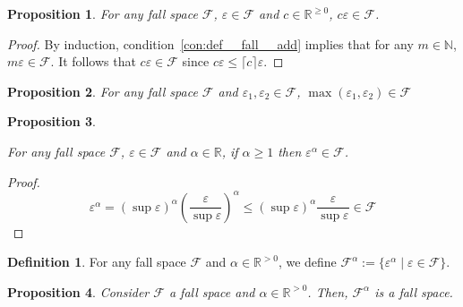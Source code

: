 \documentclass{article}
\numberwithin{equation}{section}
\theoremstyle{definition}
\newtheorem{definition}{Definition}[section]
\theoremstyle{plain}
\newtheorem{proposition}{Proposition}[section]
\newcommand{\Nats}{\mathbb{N}}
\newcommand{\Reals}{\mathbb{R}}
\newcommand{\Ceil}[1]{\lceil #1 \rceil}
\newcommand{\Fall}{\mathcal{F}}
\begin{document}
\begin{proposition}

For any fall space $\Fall$, $\varepsilon \in \Fall$ and $c \in \Reals^{\geq 0}$, $c \varepsilon \in \Fall$.

\end{proposition}

\begin{proof}

By induction, condition~\ref{con:def__fall__add} implies that for any $m \in \Nats$, $m\varepsilon \in \Fall$. It follows that $c\varepsilon \in \Fall$ since $c\varepsilon \leq \Ceil{c}\varepsilon$.
\end{proof}

\begin{proposition}

For any fall space $\Fall$ and $\varepsilon_1, \varepsilon_2 \in \Fall$, $\max(\varepsilon_1,\varepsilon_2) \in \Fall$

\end{proposition}


\begin{proposition}
\label{prp:fall_space_closed_wrt_power}

For any fall space $\Fall$, $\varepsilon \in \Fall$ and $\alpha \in \Reals$, if $\alpha \geq 1$ then $\varepsilon^\alpha \in \Fall$.

\end{proposition}

\begin{proof}

$$\varepsilon^\alpha = (\sup \varepsilon)^\alpha (\frac{\varepsilon}{\sup \varepsilon})^\alpha \leq  (\sup \varepsilon)^\alpha \frac{\varepsilon}{\sup \varepsilon} \in \Fall$$
\end{proof}

\begin{samepage}
\begin{definition}

For any fall space $\Fall$ and $\alpha \in \Reals^{>0}$, we define ${\Fall^\alpha := \{\varepsilon^\alpha \mid \varepsilon \in \Fall\}}$.

\end{definition}
\end{samepage}

\begin{proposition}

Consider $\Fall$ a fall space and $\alpha \in \Reals^{>0}$. Then, $\Fall^\alpha$ is a fall space.

\end{proposition}
\end{document}
